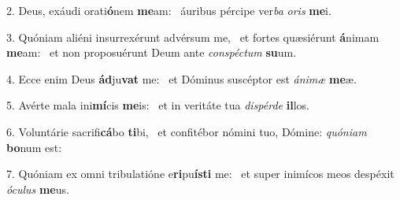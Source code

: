 2. Deus, exáudi orati\textbf{ó}nem \textbf{me}am: \ast\  áuribus pércipe ver\textit{ba} \textit{o}\textit{ris} \textbf{me}i.\

3. Quóniam aliéni insurrexérunt advérsum me, \dag\  et fortes quæsiérunt \textbf{á}nimam \textbf{me}am: \ast\  et non proposuérunt Deum ante \textit{con}\textit{spéc}\textit{tum} \textbf{su}um.\

4. Ecce enim Deus \textbf{ád}ju\textbf{vat} me: \ast\  et Dóminus suscéptor est \textit{á}\textit{ni}\textit{mæ} \textbf{me}æ.\

5. Avérte mala ini\textbf{mí}cis \textbf{me}is: \ast\  et in veritáte tua \textit{dis}\textit{pér}\textit{de} \textbf{il}los.\

6. Voluntárie sacrifi\textbf{cá}bo \textbf{ti}bi, \ast\  et confitébor nómini tuo, Dómine: \textit{quón}\textit{i}\textit{am} \textbf{bo}num est:\

7. Quóniam ex omni tribulatióne e\textbf{ri}pu\textbf{ís}\textbf{ti} me: \ast\  et super inimícos meos despéxit \textit{ó}\textit{cu}\textit{lus} \textbf{me}us.\

